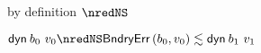 {\begin{lamportproof*}
    \begin{pfproof}
        \begin{pfproof}
            \begin{pfproof}
              by definition $\nredNS$
            \end{pfproof}
          \qedstep
            \begin{pfproof}
              \begin{mathpar}
              \end{mathpar}
            \end{pfproof}
        \end{pfproof}
        \begin{pfproof}
          \qedstep
            \begin{pfproof}
              $\edynb{\sbnd_0}{\svalue_0} \nredNS \rexpr{\boundaryerror{\sbnd_0}{\svalue_0}}{\edynb{\sbnd_1}{\svalue_1}}$
            \end{pfproof}
        \end{pfproof}
    \end{pfproof}

\end{lamportproof*}}

